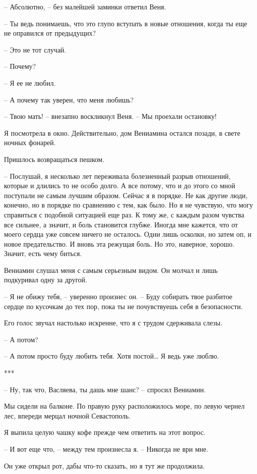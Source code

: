 \documentclass[
]{book}
\begin{document}
-- Абсолютно, -- без малейшей заминки ответил Веня.

-- Ты ведь понимаешь, что это глупо вступать в новые отношения, когда ты еще не оправился от предыдущих?

-- Это не тот случай.

-- Почему?

-- Я ее не любил.

-- А почему так уверен, что меня любишь?

-- Твою мать! -- внезапно воскликнул Веня. -- Мы проехали остановку!

Я посмотрела в окно. Действительно, дом Вениамина остался позади, в свете ночных фонарей.

Пришлось возвращаться пешком.

-- Послушай, я несколько лет переживала болезненный разрыв отношений, которые и длились то не особо долго. А все потому, что и до этого со мной поступали не самым лучшим образом. Сейчас я в порядке. Не как другие люди, конечно, но в порядке по сравнению с тем, как было. Но я не чувствую, что могу справиться с подобной ситуацией еще раз. К тому же, с каждым разом чувства все сильнее, а значит, и боль становится глубже. Иногда мне кажется, что от моего сердца уже совсем ничего не осталось. Одни лишь осколки, но затем оп, и новое предательство. И вновь эта режущая боль. Но это, наверное, хорошо. Значит, есть чему биться.

Вениамин слушал меня с самым серьезным видом. Он молчал и лишь подкуривал одну за другой.

-- Я не обижу тебя, -- уверенно произнес он. -- Буду собирать твое разбитое сердце по кусочкам до тех пор, пока ты не почувствуешь себя в безопасности.

Его голос звучал настолько искренне, что я с трудом сдерживала слезы.

-- А потом?

-- А потом просто буду любить тебя. Хотя постой\ldots{} Я ведь уже люблю.

***

-- Ну, так что, Васляева, ты дашь мне шанс? -- спросил Вениамин.

Мы сидели на балконе. По правую руку расположилось море, по левую чернел лес, впереди мерцал ночной Севастополь.

Я выпила целую чашку кофе прежде чем ответить на этот вопрос.

-- И вот еще что, -- между тем произнесла я. -- Никогда не ври мне.

Он уже открыл рот, дабы что-то сказать, но я тут же продолжила.
\end{document}
